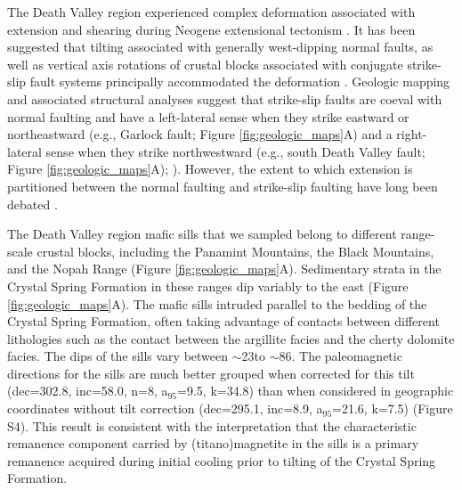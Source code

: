 The Death Valley region experienced complex deformation associated with extension and shearing during Neogene extensional tectonism \cite[e.g.][]{Wernicke1988a}. It has been suggested that tilting associated with generally west-dipping normal faults, as well as vertical axis rotations of crustal blocks associated with conjugate strike-slip fault systems principally accommodated the deformation \cite[e.g.][]{Serpa1996a}. Geologic mapping and associated structural analyses suggest that strike-slip faults are coeval with normal faulting and have a left-lateral sense when they strike eastward or northeastward (e.g., Garlock fault; Figure \ref{fig:geologic_maps}A) and a right-lateral sense when they strike northwestward (e.g., south Death Valley fault;  Figure \ref{fig:geologic_maps}A); \cite{Wright1976a, Serpa1996a, Pavlis2014a}). However, the extent to which extension is partitioned between the normal faulting and strike-slip faulting have long been debated \cite[e.g.][]{Burchfiel1965a, Guth1981a, Snow1989a, Holm1993a, Petronis2002a, Renik2013a}. 

The Death Valley region mafic sills that we sampled belong to different range-scale crustal blocks, including the Panamint Mountains, the Black Mountains, and the Nopah Range (Figure \ref{fig:geologic_maps}A). Sedimentary strata in the Crystal Spring Formation in these ranges dip variably to the east (Figure \ref{fig:geologic_maps}A). The mafic sills intruded parallel to the bedding of the Crystal Spring Formation, often taking advantage of contacts between different lithologies such as the contact between the argillite facies and the cherty dolomite facies. The dips of the sills vary between $\sim$23\textdegree to $\sim$86\textdegree. The paleomagnetic directions for the sills are much better grouped when corrected for this tilt (dec=302.8\textdegree, inc=58.0\textdegree, n=8, a$_{95}$=9.5\textdegree, k=34.8) than when considered in geographic coordinates without tilt correction (dec=295.1\textdegree, inc=8.9\textdegree, a$_{95}$=21.6\textdegree, k=7.5) (Figure S4). This result is consistent with the interpretation that the characteristic remanence component carried by (titano)magnetite in the sills is a primary remanence acquired during initial cooling prior to tilting of the Crystal Spring Formation. 

